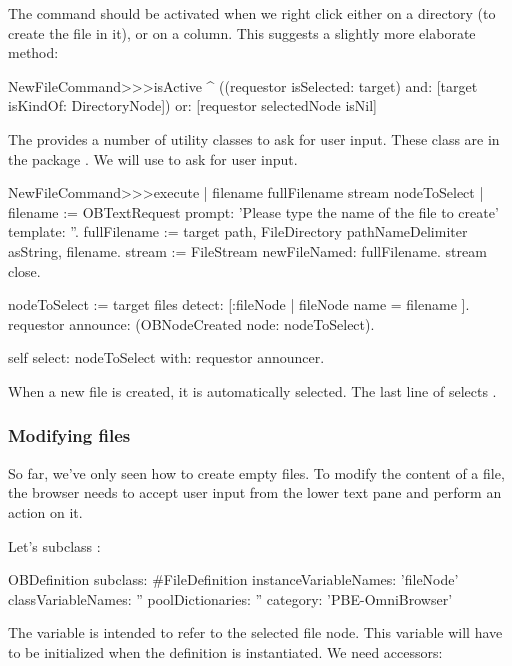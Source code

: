 \documentclass[a4paper,10pt,twoside]{book}
\begin{document}
The command should be activated when we right click either on a directory (to create the file in it), or on a column. This suggests a slightly more elaborate  method:

\begin{code}{}    
NewFileCommand>>>isActive
	^ ((requestor isSelected: target) and: [target isKindOf: DirectoryNode])
			or: [requestor selectedNode isNil]
\end{code}

The \obf provides a number of utility classes to ask for user input. These class are in the package . We will use  to ask for user input. 

\begin{code}{}    
NewFileCommand>>>execute
	| filename fullFilename stream nodeToSelect |
	filename := OBTextRequest 
					prompt: 'Please type the name of the file to create' 
					template: ''.
	fullFilename := target path, FileDirectory pathNameDelimiter asString, filename.
	stream := FileStream newFileNamed: fullFilename.
	stream close.

	nodeToSelect := target files detect: [:fileNode | fileNode name = filename ].
	requestor announce: (OBNodeCreated node: nodeToSelect).

	self select: nodeToSelect with: requestor announcer.
\end{code}

When a new file is created, it is automatically selected. The last line of  selects .


\subsubsection{Modifying files}

So far, we've only seen how to create empty files. To modify the content of a file, the browser needs to accept user input from the lower text pane and perform an action on it. 

Let's subclass :

\begin{code}{}    
OBDefinition subclass: #FileDefinition
	instanceVariableNames: 'fileNode'
	classVariableNames: ''
	poolDictionaries: ''
	category: 'PBE-OmniBrowser'
\end{code}

The variable  is intended to refer to the selected file node. This variable will have to be initialized when the definition is instantiated. We need accessors:
\end{document}
